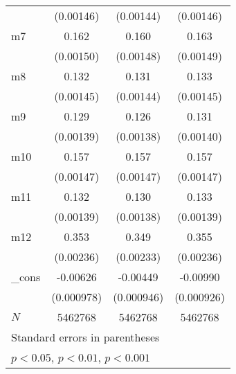 {\begin{tabular}{l*{3}{c}}
            &   (0.00146)         &   (0.00144)         &   (0.00146)         \\
m7          &       0.162\sym{***}&       0.160\sym{***}&       0.163\sym{***}\\
            &   (0.00150)         &   (0.00148)         &   (0.00149)         \\
m8          &       0.132\sym{***}&       0.131\sym{***}&       0.133\sym{***}\\
            &   (0.00145)         &   (0.00144)         &   (0.00145)         \\
m9          &       0.129\sym{***}&       0.126\sym{***}&       0.131\sym{***}\\
            &   (0.00139)         &   (0.00138)         &   (0.00140)         \\
m10         &       0.157\sym{***}&       0.157\sym{***}&       0.157\sym{***}\\
            &   (0.00147)         &   (0.00147)         &   (0.00147)         \\
m11         &       0.132\sym{***}&       0.130\sym{***}&       0.133\sym{***}\\
            &   (0.00139)         &   (0.00138)         &   (0.00139)         \\
m12         &       0.353\sym{***}&       0.349\sym{***}&       0.355\sym{***}\\
            &   (0.00236)         &   (0.00233)         &   (0.00236)         \\
\_cons      &    -0.00626\sym{***}&    -0.00449\sym{***}&    -0.00990\sym{***}\\
            &  (0.000978)         &  (0.000946)         &  (0.000926)         \\
\hline
\(N\)       &     5462768         &     5462768         &     5462768         \\
\hline\hline
\multicolumn{4}{l}{\footnotesize Standard errors in parentheses}\\
\multicolumn{4}{l}{\footnotesize \sym{*} \(p<0.05\), \sym{**} \(p<0.01\), \sym{***} \(p<0.001\)}\\
\end{tabular}
}
